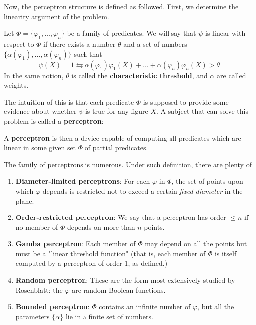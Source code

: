 Now, the perceptron structure is defined as followed. First, we determine the linearity argument of the problem. 
\begin{definition}
    Let $\Phi = \{\varphi_{1},\dots,\varphi_{n}\}$ be a family of predicates. We will say that $\psi$ is linear with respect to $\Phi$ if there exists a number $\theta$ and a set of numbers $\{\alpha(\varphi_{1}),\dots,\alpha(\varphi_{n})\}$ such that \begin{equation}
        \psi(X) = 1 \leftrightarrows \alpha(\varphi_{1})\varphi_{1}(X) + \dots + \alpha(\varphi_{n}) \varphi_{n}(X) > \theta
    \end{equation} 
    In the same notion, $\theta$ is called the \textbf{characteristic threshold}, and $\alpha$ are called weights. 
\end{definition}
The intuition of this is that each predicate $\Phi$ is supposed to provide some evidence about whether $\psi$ is true for any figure $X$. A subject that can solve this problem is called a \textbf{perceptron}: 
\begin{definition}
    A \textbf{perceptron} is then a device capable of computing all predicates which are linear in some given set $\Phi$ of partial predicates. 
\end{definition}
The family of perceptrons is numerous. Under such definition, there are plenty of
\begin{enumerate}[noitemsep]
    \item \textbf{Diameter-limited perceptrons}: For each $\varphi$ in $\Phi$, the set of points upon which $\varphi$ depends is restricted not to exceed a certain \textit{fixed diameter} in the plane. 
    \item \textbf{Order-restricted perceptron}: We say that a perceptron has order $\leq n$ if no member of $\Phi$ depends on more than $n$ points. 
    \item \textbf{Gamba perceptron}: Each member of $\Phi$ may depend on all the points but must be a "linear threshold function" (that is, each member of $\Phi$ is itself computed by a perceptron of order 1, as defined.) 
    \item \textbf{Random perceptron}: These are the form most extensively studied by Rosenblatt: the $\varphi$ are random Boolean functions. 
    \item \textbf{Bounded perceptron}: $\Phi$ contains an infinite number of $\varphi$, but all the parameters $\{\alpha\}$ lie in a finite set of numbers. 
\end{enumerate} 

